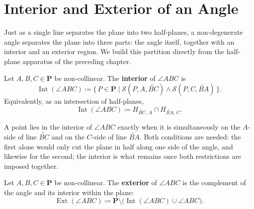 \documentclass[../../../main/main.tex]{subfiles}
\begin{document}
\section{Interior and Exterior of an Angle}

Just as a single line separates the plane into two half-planes, a non-degenerate angle separates the plane into three parts: the angle itself, together with an interior and an exterior region. We build this partition directly from the half-plane apparatus of the preceding chapter.

\begin{definition}\label{def:angle-interior}
Let $A, B, C \in \mathbf{P}$ be non-collinear. The \textbf{interior} of $\angle ABC$ is
\[
\operatorname{Int}(\angle ABC) \coloneqq \{\, P \in \mathbf{P} \mid \mathcal{S}(P, A, \overleftrightarrow{BC}) \land \mathcal{S}(P, C, \overleftrightarrow{BA}) \,\}.
\]
Equivalently, as an intersection of half-planes,
\[
\operatorname{Int}(\angle ABC) \coloneqq H_{\overleftrightarrow{BC},\,A} \cap H_{\overleftrightarrow{BA},\,C}.
\]
\end{definition}

A point lies in the interior of $\angle ABC$ exactly when it is simultaneously on the $A$-side of line $\overleftrightarrow{BC}$ and on the $C$-side of line $\overleftrightarrow{BA}$. Both conditions are needed: the first alone would only cut the plane in half along one side of the angle, and likewise for the second; the interior is what remains once both restrictions are imposed together.

\begin{definition}\label{def:angle-exterior}
Let $A, B, C \in \mathbf{P}$ be non-collinear. The \textbf{exterior} of $\angle ABC$ is the complement of the angle and its interior within the plane:
\[
\operatorname{Ext}(\angle ABC) \coloneqq \mathbf{P} \setminus \bigl(\operatorname{Int}(\angle ABC) \cup \angle ABC\bigr).
\]
\end{definition}
\end{document}
